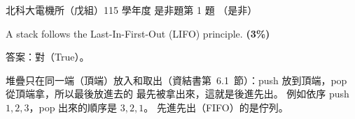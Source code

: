 \begin{pastexam}[label={px:ntut-115-ee-ds-01}]{北科大電機所（戊組）115 學年度 是非題第 1 題}
（是非）

A stack follows the Last-In-First-Out (LIFO) principle. \textbf{(3\%)}
\end{pastexam}

\begin{pastsoln}
答案：對（True）。

堆疊只在同一端（頂端）放入和取出（資結書第~6.1~節）：push 放到頂端，pop 從頂端拿，所以最後放進去的
最先被拿出來，這就是後進先出。 例如依序 push $1, 2, 3$，pop 出來的順序是 $3, 2, 1$。 先進先出（FIFO）的是佇列。
\end{pastsoln}
